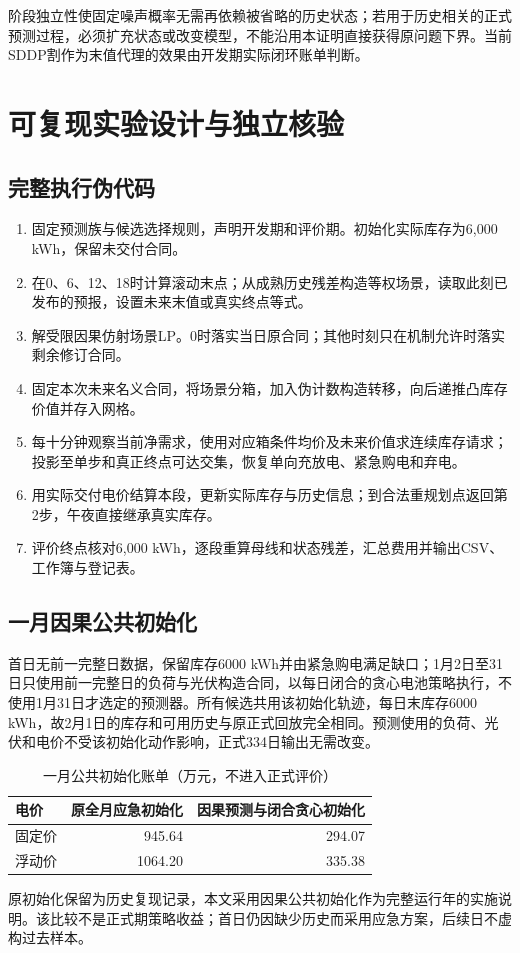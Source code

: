 阶段独立性使固定噪声概率无需再依赖被省略的历史状态；若用于历史相关的正式预测过程，必须扩充状态或改变模型，不能沿用本证明直接获得原问题下界。当前SDDP割作为末值代理的效果由开发期实际闭环账单判断。

\section{可复现实验设计与独立核验}
\subsection{完整执行伪代码}
\begin{enumerate}
\item 固定预测族与候选选择规则，声明开发期和评价期。初始化实际库存为6,000 kWh，保留未交付合同。
\item 在0、6、12、18时计算滚动末点；从成熟历史残差构造等权场景，读取此刻已发布的预报，设置未来末值或真实终点等式。
\item 解受限因果仿射场景LP。0时落实当日原合同；其他时刻只在机制允许时落实剩余修订合同。
\item 固定本次未来名义合同，将场景分箱，加入伪计数构造转移，向后递推凸库存价值并存入网格。
\item 每十分钟观察当前净需求，使用对应箱条件均价及未来价值求连续库存请求；投影至单步和真正终点可达交集，恢复单向充放电、紧急购电和弃电。
\item 用实际交付电价结算本段，更新实际库存与历史信息；到合法重规划点返回第2步，午夜直接继承真实库存。
\item 评价终点核对6,000 kWh，逐段重算母线和状态残差，汇总费用并输出CSV、工作簿与登记表。
\end{enumerate}

\subsection{一月因果公共初始化}
首日无前一完整日数据，保留库存6000 kWh并由紧急购电满足缺口；1月2日至31日只使用前一完整日的负荷与光伏构造合同，以每日闭合的贪心电池策略执行，不使用1月31日才选定的预测器。所有候选共用该初始化轨迹，每日末库存6000 kWh，故2月1日的库存和可用历史与原正式回放完全相同。预测使用的负荷、光伏和电价不受该初始化动作影响，正式334日输出无需改变。
\begin{table}[H]\centering\small\caption{一月公共初始化账单（万元，不进入正式评价）}
\begin{tabular}{lrr}\toprule
电价&原全月应急初始化&因果预测与闭合贪心初始化\\\midrule
固定价&945.64&294.07\\
浮动价&1064.20&335.38\\\bottomrule\end{tabular}\end{table}
原初始化保留为历史复现记录，本文采用因果公共初始化作为完整运行年的实施说明。该比较不是正式期策略收益；首日仍因缺少历史而采用应急方案，后续日不虚构过去样本。

